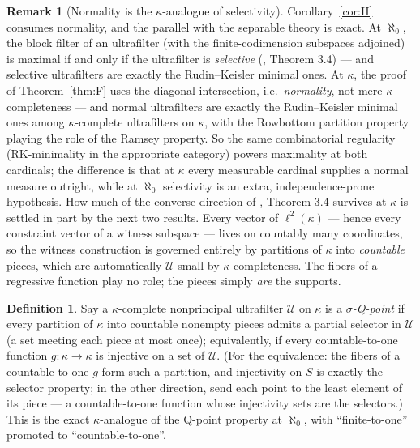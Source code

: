 \documentclass[11pt,reqno]{amsart}
\theoremstyle{definition}
\newtheorem{definition}[theorem]{Definition}
\newtheorem{remark}[theorem]{Remark}
\newcommand{\U}{\mathcal{U}}
\newcommand{\lk}{\ell^2(\kappa)}
\begin{document}
\begin{remark}[Normality is the $\kappa$-analogue of selectivity]\label{rem:normality}
Corollary~\ref{cor:H} consumes normality, and the parallel with the separable theory
is exact. At $\aleph_0$, the block
filter of an ultrafilter (with the finite-codimension subspaces adjoined) is maximal
if and only if the ultrafilter is \emph{selective} (\cite{FWII}, Theorem 3.4) --- and
selective ultrafilters are exactly the Rudin--Keisler minimal ones. At $\kappa$, the
proof of Theorem~\ref{thm:F} uses the diagonal intersection, i.e.\ \emph{normality},
not mere $\kappa$-completeness --- and normal ultrafilters are exactly the
Rudin--Keisler minimal ones among $\kappa$-complete ultrafilters on $\kappa$, with
the Rowbottom partition property playing the role of the Ramsey property. So the
same combinatorial regularity (RK-minimality in the appropriate category) powers
maximality at both cardinals; the difference is that at $\kappa$ every measurable
cardinal supplies a normal measure outright, while at $\aleph_0$ selectivity is an
extra, independence-prone hypothesis. How much of the converse direction of
\cite{FWII}, Theorem 3.4 survives at $\kappa$ is settled in part by the next two
results. Every vector of $\lk$ --- hence every constraint vector of a witness
subspace --- lives on countably many coordinates, so the witness construction is
governed entirely by partitions of $\kappa$ into \emph{countable} pieces, which are
automatically $\U$-small by $\kappa$-completeness. The fibers of a regressive function
play no role; the pieces simply \emph{are} the supports.
\end{remark}

\begin{definition}
Say a $\kappa$-complete nonprincipal ultrafilter $\U$ on $\kappa$ is a
\emph{$\sigma$-Q-point} if every partition of $\kappa$ into countable nonempty
pieces admits a partial selector in $\U$ (a set meeting each piece at most once);
equivalently, if every countable-to-one function $g:\kappa\to\kappa$ is injective
on a set of $\U$. (For the equivalence: the fibers of a countable-to-one $g$ form
such a partition, and injectivity on $S$ is exactly the selector property; in the
other direction, send each point to the least element of its piece --- a
countable-to-one function whose injectivity sets are the selectors.) This is the
exact $\kappa$-analogue of the Q-point property at $\aleph_0$, with
``finite-to-one'' promoted to ``countable-to-one''.
\end{definition}
\end{document}

